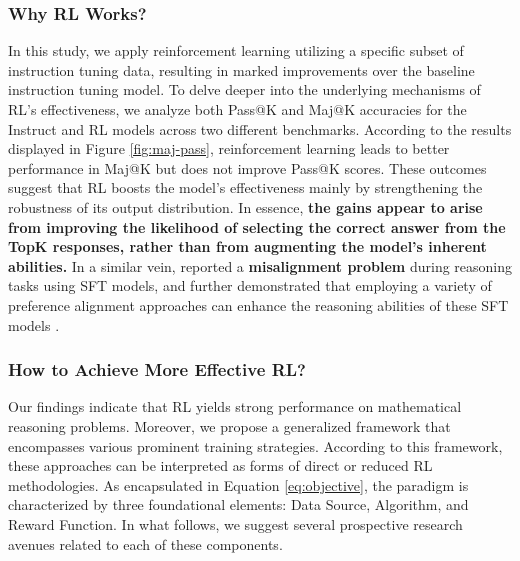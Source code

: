 \begin{itemize}[topsep=0pt]
\begin{itemize}[topsep=0pt]
\subsubsection{Why RL Works?} In this study, we apply reinforcement learning utilizing a specific subset of instruction tuning data, resulting in marked improvements over the baseline instruction tuning model. To delve deeper into the underlying mechanisms of RL’s effectiveness, we analyze both Pass@K and Maj@K accuracies for the Instruct and RL models across two different benchmarks. According to the results displayed in Figure \ref{fig:maj-pass}, reinforcement learning leads to better performance in Maj@K but does not improve Pass@K scores. These outcomes suggest that RL boosts the model’s effectiveness mainly by strengthening the robustness of its output distribution. In essence, \textbf{the gains appear to arise from improving the likelihood of selecting the correct answer from the TopK responses, rather than from augmenting the model’s inherent abilities.} In a similar vein, \citep{wang2023making} reported a \textbf{misalignment problem} during reasoning tasks using SFT models, and further demonstrated that employing a variety of preference alignment approaches can enhance the reasoning abilities of these SFT models \citep{yuan2023rrhf,song2023preference,wang2023making}.

\subsubsection{How to Achieve More Effective RL?}
\label{sec:effec_rl}
Our findings indicate that RL yields strong performance on mathematical reasoning problems. Moreover, we propose a generalized framework that encompasses various prominent training strategies. According to this framework, these approaches can be interpreted as forms of direct or reduced RL methodologies. As encapsulated in Equation \ref{eq:objective}, the paradigm is characterized by three foundational elements: Data Source, Algorithm, and Reward Function. In what follows, we suggest several prospective research avenues related to each of these components.


\end{itemize}
\end{itemize}
